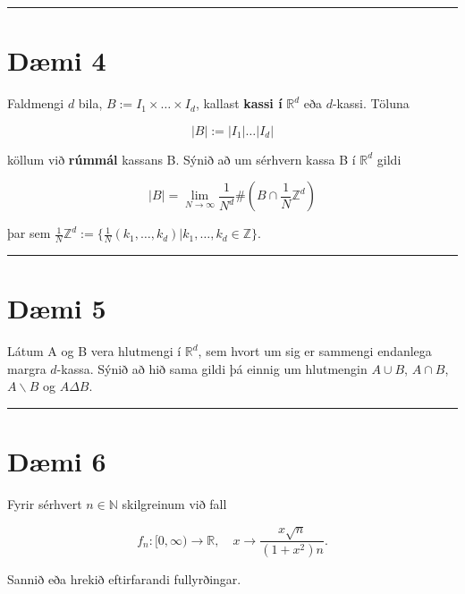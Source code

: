 \documentclass[]{book}
\begin{document}
\begin{center}\rule{0.5\linewidth}{\linethickness}\end{center}

\hypertarget{dmi-4-1}{%
\section*{Dæmi 4}\label{dmi-4-1}}

Faldmengi \(d\) bila, \(B := I_1\times\dots\times I_d\), kallast \textbf{kassi í} \(\mathbb R^d\) eða \(d\)-kassi. Töluna

\[
|B| := |I_1|\dots|I_d|
\]

köllum við \textbf{rúmmál} kassans B. Sýnið að um sérhvern kassa B í \(\mathbb R^d\) gildi

\[
|B| = \lim_{N\rightarrow\infty}\frac{1}{N^d}\#\left(B\cap\frac1N\mathbb Z^d\right)
\]

þar sem \(\frac1N\mathbb Z^d := \{\frac1N(k_1, \dots, k_d)|k_1,\dots,k_d\in\mathbb Z\}\).

\begin{center}\rule{0.5\linewidth}{\linethickness}\end{center}

\hypertarget{dmi-5-1}{%
\section*{Dæmi 5}\label{dmi-5-1}}

Látum A og B vera hlutmengi í \(\mathbb R^d\), sem hvort um sig er sammengi endanlega margra \(d\)-kassa. Sýnið að hið sama gildi þá einnig um hlutmengin \(A\cup B\), \(A\cap B\), \(A\backslash B\) og \(A\Delta B\).

\begin{center}\rule{0.5\linewidth}{\linethickness}\end{center}

\hypertarget{dmi-6-1}{%
\section*{Dæmi 6}\label{dmi-6-1}}

Fyrir sérhvert \(n\in\mathbb N\) skilgreinum við fall

\[
f_n:[0,\infty)\rightarrow\mathbb R, \quad x\rightarrow \frac{x\sqrt n}{(1+x^2)n}.
\]

Sannið eða hrekið eftirfarandi fullyrðingar.
\end{document}
